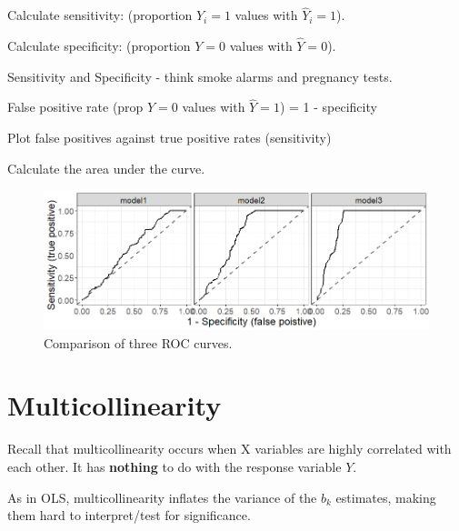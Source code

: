 \documentclass[12pt]{notes}
\begin{document}
\item Calculate sensitivity: (proportion $Y_i=1$ values with $\hat{Y}_i = 1$).
\item Calculate specificity: (proportion $Y = 0$ values with $\hat{Y} = 0$). 
\bi
\item Sensitivity and Specificity - think smoke alarms and pregnancy tests. 
\ei
\item False positive rate (prop $Y=0$ values with $\hat{Y} = 1$) = 1 - specificity
\item Plot false positives against true positive rates (sensitivity)
\item Calculate the area under the curve. 
\ei
\ei
\ei



\begin{figure}[H]
\centering
\includegraphics[width = \textwidth]{figures/module5/roc_curves.png}
\caption{Comparison of three ROC curves.}
\label{fig:ROC}
\end{figure}


\begin{minipage}[l][2cm][c]{\textwidth}
\end{minipage}

 
\section{Multicollinearity}
Recall that multicollinearity occurs when X variables are highly correlated with each other. It has \textbf{nothing} to do with the response variable $Y.$

\nspace
As in OLS, multicollinearity inflates the variance of the $b_k$ estimates, making them hard to interpret/test for significance.
\end{document}
